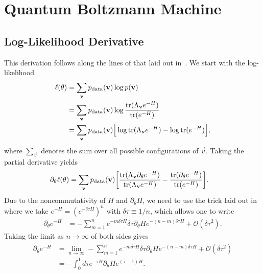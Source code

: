 \chapter{Quantum Boltzmann Machine}
\section{Log-Likelihood Derivative}\label{app:qbm_log_likelihood_derivation}
This derivation follows along the lines of that laid out in~\cite{amin_2018}.
We start with the log-likelihood
\begin{align}
\begin{split}
    \ell(\theta)
        &= \sum_{\mathbf{v}} p_{\text{data}}(\mathbf{v}) \log p(\mathbf{v}) \\
        &= \sum_{\mathbf{v}} p_{\text{data}}(\mathbf{v}) \log \frac{\text{tr}(\Lambda_{\mathbf{v}} e^{-H})}{\text{tr}(e^{-H})} \\
        &= \sum_{\mathbf{v}} p_{\text{data}}(\mathbf{v}) \Big[ \log\text{tr}(\Lambda_{\mathbf{v}} e^{-H}) - \log\text{tr}(e^{-H}) \Big],
\end{split}
\end{align}
where \( \sum_{\vec{v}} \) denotes the sum over all possible configurations of \( \vec{v} \).
Taking the partial derivative yields
\begin{align}
    \label{eq:qbm_log_likelihood_derivative}
    \partial_\theta \ell(\theta)
        &= \sum_{\mathbf{v}} p_{\text{data}}(\mathbf{v}) \bigg[ \frac{\text{tr}(\Lambda_{\mathbf{v}} \partial_\theta e^{-H})}{\text{tr}(\Lambda_{\mathbf{v}} e^{-H})} - \frac{\text{tr}(\partial_\theta e^{-H})}{\text{tr}(e^{-H})} \bigg].
\end{align}
Due to the noncommutativity of \( H \) and \( \partial_\theta H \), we need to use the trick laid out in~\cite{amin_2018} where we take \( e^{-H} = (e^{-\delta\tau H})^n \) with \( \delta\tau \equiv 1 / n \), which allows one to write
\begin{align}
    \partial_\theta e^{-H}
        &= -\sum_{m=1}^{n} e^{-m\delta\tau H} \delta\tau \partial_\theta He^{-(n-m)\delta\tau H} + \mathcal{O}(\delta\tau^2).
\end{align}
Taking the limit as \( n \rightarrow \infty \) of both sides gives
\begin{align}
\begin{split}
    \partial_\theta e^{-H}
        &= \lim_{n\rightarrow\infty} -\sum_{m=1}^{n} e^{-m\delta\tau H} \delta\tau \partial_\theta He^{-(n-m)\delta\tau H} + \mathcal{O}(\delta\tau^2) \\
        &= -\int_{0}^{1} d\tau e^{-\tau H} \partial_\theta H e^{(\tau-1)H}.
\end{split}
\end{align}
